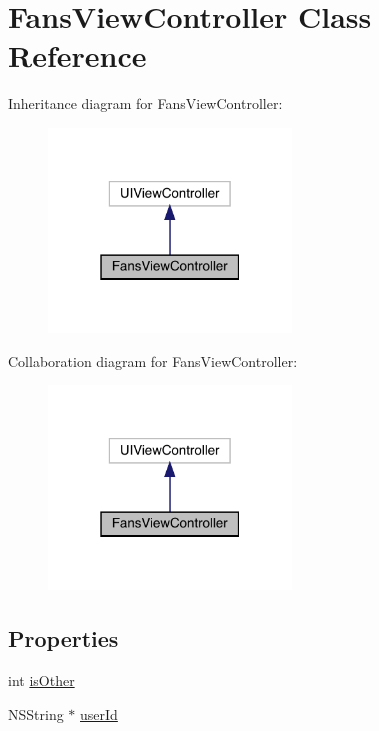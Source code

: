 \hypertarget{interface_fans_view_controller}{}\section{Fans\+View\+Controller Class Reference}
\label{interface_fans_view_controller}


Inheritance diagram for Fans\+View\+Controller\+:\nopagebreak
\begin{figure}[H]
\begin{center}
\leavevmode
\includegraphics[width=183pt]{interface_fans_view_controller__inherit__graph}
\end{center}
\end{figure}


Collaboration diagram for Fans\+View\+Controller\+:\nopagebreak
\begin{figure}[H]
\begin{center}
\leavevmode
\includegraphics[width=183pt]{interface_fans_view_controller__coll__graph}
\end{center}
\end{figure}
\subsection*{Properties}
\begin{DoxyCompactItemize}
\item 
int \mbox{\hyperlink{interface_fans_view_controller_a7acef79a23e48cf84651b7fe0cf03ef5}{is\+Other}}
\item 
N\+S\+String $\ast$ \mbox{\hyperlink{interface_fans_view_controller_a899cdc718e0fda339eb956a66a9cb89d}{user\+Id}}
\end{DoxyCompactItemize}


